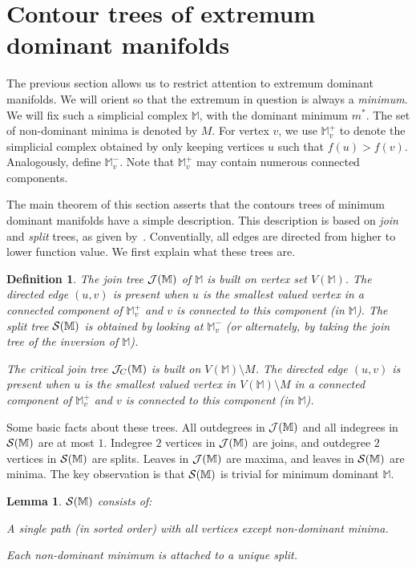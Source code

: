 \documentclass[11pt]{article}
\newtheorem{lemma}[theorem]{Lemma}
\newtheorem{definition}[theorem]{Definition}
\theoremstyle{definition}
\newcommand{\cJ}{{\cal J}}
\newcommand{\cS}{{\cal S}}
\newcommand{\MM}{\mathbb{M}}
\newcommand{\jc}{\cJ_C}
\begin{document}
\section{Contour trees of extremum dominant manifolds} \label{sec:paint}

The previous section allows us to restrict attention to extremum dominant manifolds.
We will orient so that the extremum in question is always a \emph{minimum}.
We will fix such a simplicial complex $\MM$, with the dominant minimum $m^*$. 
The set of non-dominant minima is denoted by $M$.
For vertex $v$, we use $\MM^+_v$ to denote the simplicial complex obtained by only
keeping vertices $u$ such that $f(u) > f(v)$. Analogously, define $\MM^-_v$. Note that $\MM^+_v$ may contain
numerous connected components. 

The main theorem of this section asserts that the contours trees of minimum dominant manifolds have a simple description.
This description is based on \emph{join} and \emph{split} trees, as given by~\cite{csa-cctad-00}.
Conventially, all edges are directed from higher to lower function value.
We first explain what these trees are.

\begin{definition} \label{join} The join tree $\cJ(\MM)$ of $\MM$ is built on vertex set $V(\MM)$.
The directed edge $(u,v)$ is present when $u$ is the smallest valued vertex in a connected component of $\MM^+_v$
\emph{and} $v$ is connected to this component (in $\MM$). The split tree $\cS(\MM)$ is obtained
by looking at $\MM^-_v$ (or alternately, by taking the join tree of the inversion of $\MM$). 

The critical join tree $\jc(\MM)$ is built on $V(\MM) \setminus M$. 
The directed edge $(u,v)$ is present when $u$ is the smallest valued vertex in $V(\MM) \setminus M$ in a connected component of $\MM^+_v$
and $v$ is connected to this component (in $\MM$). 
\end{definition}


Some basic facts about these trees. 
All outdegrees in $\cJ(\MM)$ and all indegrees in $\cS(\MM)$ are at most $1$.
Indegree $2$ vertices in $\cJ(\MM)$ are joins, and outdegree $2$ vertices in $\cS(\MM)$ are splits.
Leaves in $\cJ(\MM)$ are maxima, and leaves in $\cS(\MM)$ are minima.
The key observation is that $\cS(\MM)$ is trivial for minimum dominant $\MM$.

\begin{lemma} \label{lem:split} $\cS(\MM)$ consists of:
\begin{asparaitem}
	\item A single path (in sorted order) with all vertices except non-dominant minima.
	\item Each non-dominant minimum is attached to a unique split.
\end{asparaitem}
\end{lemma}
\end{document}
